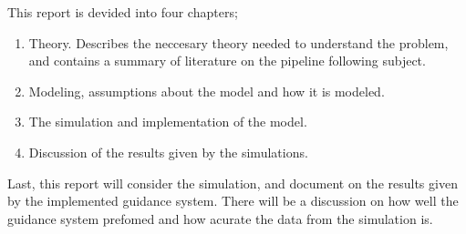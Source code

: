 	This report is devided into four chapters;
	\begin{enumerate}
	 \item Theory. Describes the neccesary theory needed to understand the problem, and contains a summary
	of literature on the pipeline following subject.
	 \item Modeling, assumptions about the model and how it is modeled.
	 \item The simulation and implementation of the model.
	 \item Discussion of the results given by the simulations.
	\end{enumerate}

	Last, this report will consider the simulation, and document on the results given by the implemented 
	guidance system. There will be a discussion on how well the guidance system prefomed and how acurate
	the data from the simulation is. 
	
	
	

